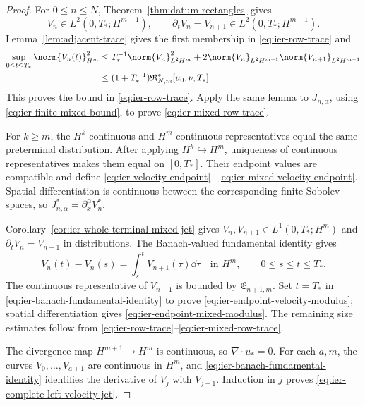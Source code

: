 \begin{proof}
For \(0\le n\le N\), Theorem~\ref{thm:datum-rectangles} gives
\[
 V_n\in L^2(0,T_*;H^{m+1}),
 \qquad
 \partial_tV_n=V_{n+1}\in L^2(0,T_*;H^{m-1}).
\]
Lemma~\ref{lem:adjacent-trace} gives the first membership in
\eqref{eq:ier-row-trace} and
\begin{align*}
 \sup_{0\le t\le T_*}\norm{V_n(t)}_{H^m}^2
 &\le T_*^{-1}\norm{V_n}_{L^2H^m}^2
 +2\norm{V_n}_{L^2H^{m+1}}\norm{V_{n+1}}_{L^2H^{m-1}}\\
 &\le(1+T_*^{-1})\mathfrak R_{N,m}^*[u_0,\nu,T_*].
\end{align*}
This proves the bound in \eqref{eq:ier-row-trace}.  Apply the same lemma to
\(J_{n,\alpha}\), using \eqref{eq:ier-finite-mixed-bound}, to prove
\eqref{eq:ier-mixed-row-trace}.

For \(k\ge m\), the \(H^k\)-continuous and \(H^m\)-continuous
representatives equal the same preterminal distribution.  After applying
\(H^k\hookrightarrow H^m\), uniqueness of continuous representatives makes
them equal on \([0,T_*]\).  Their endpoint values are compatible and define
\eqref{eq:ier-velocity-endpoint}--
\eqref{eq:ier-mixed-velocity-endpoint}.  Spatial differentiation is
continuous between the corresponding finite Sobolev spaces, so
\(J_{n,\alpha}^*=\partial_x^\alpha V_n^*\).

Corollary~\ref{cor:ier-whole-terminal-mixed-jet} gives
\(V_n,V_{n+1}\in L^1(0,T_*;H^m)\) and
\(\partial_tV_n=V_{n+1}\) in distributions.  The Banach-valued fundamental
identity gives
\begin{equation}
 V_n(t)-V_n(s)=\int_s^tV_{n+1}(\tau)\dd\tau
 \quad\text{in }H^m,
 \qquad0\le s\le t\le T_*.
 \label{eq:ier-banach-fundamental-identity}
\end{equation}
The continuous representative of \(V_{n+1}\) is bounded by
\(\mathfrak E_{n+1,m}\).  Set \(t=T_*\) in
\eqref{eq:ier-banach-fundamental-identity} to prove
\eqref{eq:ier-endpoint-velocity-modulus}; spatial differentiation gives
\eqref{eq:ier-endpoint-mixed-modulus}.  The remaining size estimates follow
from \eqref{eq:ier-row-trace}--\eqref{eq:ier-mixed-row-trace}.

The divergence map \(H^{m+1}\to H^m\) is continuous, so
\(\nabla\cdot u_*=0\).  For each \(a,m\), the curves
\(V_0,\ldots,V_{a+1}\) are continuous in \(H^m\), and
\eqref{eq:ier-banach-fundamental-identity} identifies the derivative of
\(V_j\) with \(V_{j+1}\).  Induction in \(j\) proves
\eqref{eq:ier-complete-left-velocity-jet}.
\end{proof}

